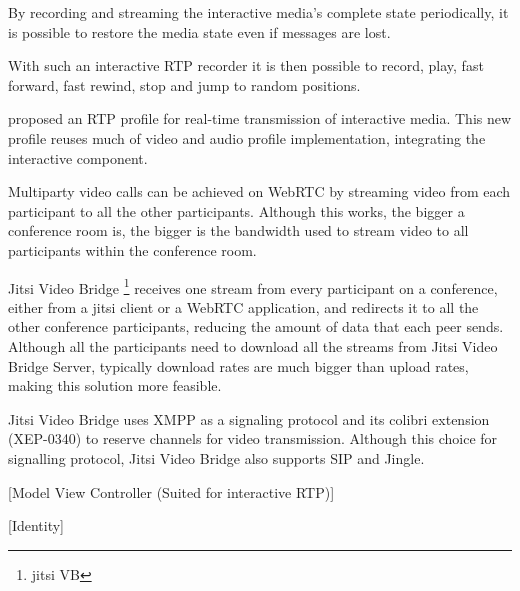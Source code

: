 	By recording and streaming the interactive media's complete state periodically, it is possible to restore the media state even if messages are lost.

	With such an interactive \ac{RTP} recorder it is then possible to record, play, fast forward, fast rewind, stop and jump to random positions.

  \cite{interactive_stream} proposed an \ac{RTP} profile for real-time transmission of interactive media. This new profile reuses much of video and audio profile implementation, integrating the interactive component.
	
	Multiparty video calls can be achieved on \ac{WebRTC} by streaming video from each participant to all the other participants. Although this works, the bigger a conference room is, the bigger is the bandwidth used to stream video to all participants within the conference room.

	Jitsi Video Bridge \footnote{jitsi VB} receives one stream from every participant on a conference, either from a jitsi client or a \ac{WebRTC} application, and redirects it to all the other conference participants, reducing the amount of data that each peer sends. Although all the participants need to download all the streams from Jitsi Video Bridge Server, typically download rates are much bigger than upload rates, making this solution more feasible.

	Jitsi Video Bridge uses \ac{XMPP} as a signaling protocol and its colibri extension (XEP-0340) to reserve channels for video transmission. Although this choice for signalling protocol, Jitsi Video Bridge also supports \ac{SIP} and \ac{Jingle}.


  {\color{red}[Model View Controller (Suited for interactive RTP)]}


  {\color{red}[Identity]}



